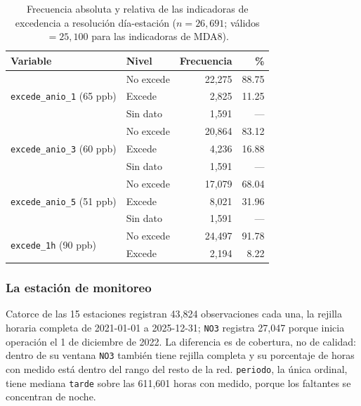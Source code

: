 \begin{table}[pos=t]
  \centering
  \caption{Frecuencia absoluta y relativa de las indicadoras de excedencia a
    resolución día-estación ($n = 26{,}691$; válidos $= 25{,}100$ para las
    indicadoras de MDA8).}
  \label{tab:freq-diaria}
  \small
  \begin{tabular}{llrr}
    \toprule
    Variable & Nivel & Frecuencia & \% \\
    \midrule
    \multirow{3}{*}{\texttt{excede\_anio\_1} (65 ppb)}
                                        & No excede &  22,275 &  88.75 \\
                                        & Excede    &   2,825 &  11.25 \\
                                        & Sin dato  &   1,591 &    --- \\
    \midrule
    \multirow{3}{*}{\texttt{excede\_anio\_3} (60 ppb)}
                                        & No excede &  20,864 &  83.12 \\
                                        & Excede    &   4,236 &  16.88 \\
                                        & Sin dato  &   1,591 &    --- \\
    \midrule
    \multirow{3}{*}{\texttt{excede\_anio\_5} (51 ppb)}
                                        & No excede &  17,079 &  68.04 \\
                                        & Excede    &   8,021 &  31.96 \\
                                        & Sin dato  &   1,591 &    --- \\
    \midrule
    \multirow{2}{*}{\texttt{excede\_1h} (90 ppb)}
                                        & No excede &  24,497 &  91.78 \\
                                        & Excede    &   2,194 &   8.22 \\
    \bottomrule
  \end{tabular}
\end{table}

\subsubsection{La estación de monitoreo}

Catorce de las 15 estaciones registran 43,824 observaciones cada una, la
rejilla horaria completa de 2021-01-01 a 2025-12-31; \texttt{NO3} registra
27,047 porque inicia operación el 1 de diciembre de 2022. La diferencia es de
cobertura, no de calidad: dentro de su ventana \texttt{NO3} también tiene
rejilla completa y su porcentaje de horas con  medido está dentro del
rango del resto de la red. \texttt{periodo}, la única
ordinal, tiene mediana \texttt{tarde} sobre las 611,601 horas con 
medido, porque los faltantes se concentran de noche.

